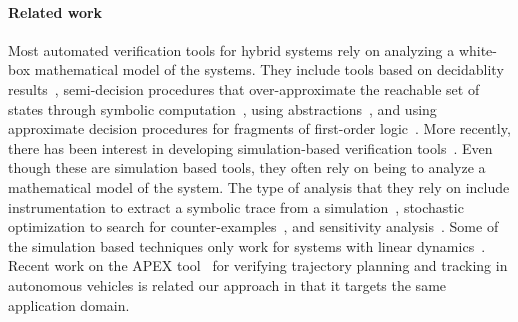 
\vspace{-10pt}
\paragraph{Related work}
Most automated verification tools for hybrid systems rely on analyzing
a white-box mathematical model of the systems. They include tools
based on decidablity
results~\cite{doty95,hh95,ck99,adm02,Dutertre04timedsystems,fre05},
semi-decision procedures that over-approximate the reachable set of
states through symbolic
computation~\cite{gm99,mt00,bt00,kv00,st00,Frehse:cav11,ariadne,flow},
using
abstractions~\cite{adi03,efhkost03-1,efhkost03-2,Henzinger_refinement,seg07,07-HSolver,dkl07,JKWB:HSCC:2007,HareFMSD,14-sttt,14-AGAR,15-PLC-CEGAR,HareTACAS16},
and using approximate decision procedures for fragments of first-order
logic~\cite{dreach}.
%
More recently, there has been interest in developing simulation-based
verification
tools~\cite{Julius:2007:RTG:1760804.1760833,SensitivityDM,donze2010breach,Kanade09,staliro-tool-paper,Fainekos:2009:RTL:1609208.1609591,DRJqest13,DuggiralaMV:2015c2e2}. Even though
these are simulation based tools, they often rely on being to analyze
a mathematical model of the system. The type of analysis that they
rely on include instrumentation to extract a symbolic trace from a
simulation~\cite{Kanade09}, stochastic optimization to search for
counter-examples~\cite{staliro-tool-paper,Fainekos:2009:RTL:1609208.1609591},
and sensitivity
analysis~\cite{SensitivityDM,donze2010breach,DRJqest13,DuggiralaMV:2015c2e2}. Some
of the simulation based techniques only work for systems with linear
dynamics~\cite{Sim2Veri,ILABS}.  Recent work on the APEX tool~\cite{o2016apex} for verifying trajectory planning and tracking in autonomous vehicles is related our approach in that it targets the same application domain.
